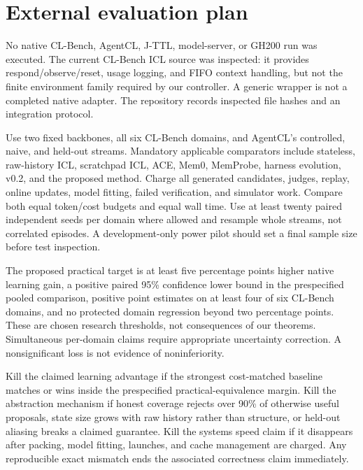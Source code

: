 \documentclass[10pt,twocolumn]{article}
\begin{document}
\balance
\section{External evaluation plan}
No native CL-Bench, AgentCL, J-TTL, model-server, or GH200 run was executed. The
current CL-Bench ICL source was inspected: it provides respond/observe/reset,
usage logging, and FIFO context handling, but not the finite environment family
required by our controller. A generic wrapper is not a completed native adapter.
The repository records inspected file hashes and an integration protocol.

Use two fixed backbones, all six CL-Bench domains, and AgentCL's controlled,
naive, and held-out streams. Mandatory applicable comparators include stateless,
raw-history ICL, scratchpad ICL, ACE, Mem0, MemProbe, harness evolution, v0.2,
and the proposed method. Charge all generated candidates, judges, replay,
online updates, model fitting, failed verification, and simulator work. Compare
both equal token/cost budgets and equal wall time. Use at least twenty paired
independent seeds per domain where allowed and resample whole streams, not
correlated episodes. A development-only power pilot should set a final sample
size before test inspection.

The proposed practical target is at least five percentage points higher native
learning gain, a positive paired 95\% confidence lower bound in the prespecified
pooled comparison, positive point estimates on at least four of six CL-Bench
domains, and no protected domain regression beyond two percentage points. These
are chosen research thresholds, not consequences of our theorems. Simultaneous
per-domain claims require appropriate uncertainty correction. A nonsignificant
loss is not evidence of noninferiority.

Kill the claimed learning advantage if the strongest cost-matched baseline
matches or wins inside the prespecified practical-equivalence margin. Kill the
abstraction mechanism if honest coverage rejects over 90\% of otherwise useful
proposals, state size grows with raw history rather than structure, or held-out
aliasing breaks a claimed guarantee. Kill the systems speed claim if it disappears
after packing, model fitting, launches, and cache management are charged. Any
reproducible exact mismatch ends the associated correctness claim immediately.
\end{document}
